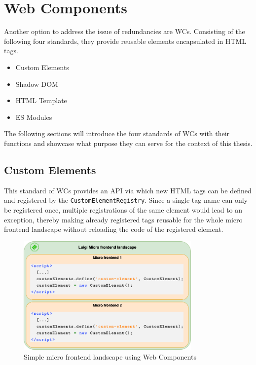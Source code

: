 \chapter{Web Components} %
\label{Chapter4}


Another option to address the issue of redundancies are WCs. Consisting of the following four standards, they provide reusable elements encapsulated in HTML tags.\cite{mdn_web_docs}

\begin{itemize}[noitemsep]
	\item Custom Elements
	\item Shadow DOM
	\item HTML Template
	\item ES Modules
\end{itemize}

The following sections will introduce the four standards of WCs with their functions and showcase what purpose they can serve for the context of this thesis.

\section{Custom Elements}

This standard of WCs provides an API via which new HTML tags can be defined and registered by the \texttt{CustomElementRegistry}. Since a single tag name can only be registered once, multiple registrations of the same element would lead to an exception, thereby making already registered tags reusable for the whole micro frontend landscape without reloading the code of the registered element.\cite{google_reusable_wcs}

\begin{figure}[!h]
	\centering
	\includegraphics[width=0.8\textwidth]{Figures/customElements_registered_2.drawio.png}
	\caption{Simple micro frontend landscape using Web Components}
	\label{fig:same_wc_example}
\end{figure}

